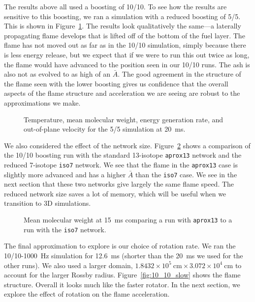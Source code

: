 \documentclass[trackchanges,preprint,times,tighten]{aastex63}
\begin{document}
The results above all used a boosting of 10/10.  To see how the
results are sensitive to this boosting, we ran a simulation with a reduced
boosting of 5/5.  This is shown in Figure~\ref{fig:5_5_overview}.  The
results look qualitatively the same---a laterally propagating flame
develops that is lifted off of the bottom of the fuel layer.  The
flame has not moved out as far as in the 10/10 simulation, simply
because there is less energy release, but we expect that if we were to
run this out twice as long, the flame would have advanced to the
position seen in our 10/10 runs.  The ash is also not as evolved to as high of an $\bar{A}$.  The good agreement in the structure
of the flame seen with the lower boosting gives us confidence that the
overall aspects of the flame structure and acceleration we are seeing
are robust to the approximations we make.

\begin{figure}[t]
\centering
{}
\caption{\label{fig:5_5_overview} Temperature, mean molecular weight, energy generation rate, and out-of-plane velocity for the 5/5 simulation at 20~ms.}
\end{figure}

We also considered the effect of the network size.
Figure~\ref{fig:network} shows a comparison of the 10/10 boosting run
with the standard 13-isotope {\tt aprox13} network and the reduced
7-isotope {\tt iso7} network.  We see that the flame in the {\tt aprox13}
case is slightly more advanced and has a higher $\bar{A}$ than the {\tt iso7}
case.  We see in the next section that these two networks give largely
the same flame speed.  The reduced network size saves a lot of memory,
which will be useful when we transition to 3D simulations.

\begin{figure}[t]
\centering
{}
\caption{\label{fig:network} Mean molecular weight at 15~ms comparing a run with
  {\tt aprox13} to a run with the {\tt iso7} network.}
\end{figure}


The final approximation to explore is our choice of rotation rate.  We ran the 10/10-1000~Hz
simulation for 12.6~ms (shorter than the 20~ms we
used for the other runs).  We also used a larger domain, $1.8432\times
10^5~\mathrm{cm} \times 3.072\times 10^4~\mathrm{cm}$ to account for
the larger Rossby radius.  Figure~\ref{fig:10_10_slow} shows the flame
structure.  Overall it looks much like the faster rotator.  In the
next section, we explore the effect of rotation on the flame
acceleration.
\end{document}
